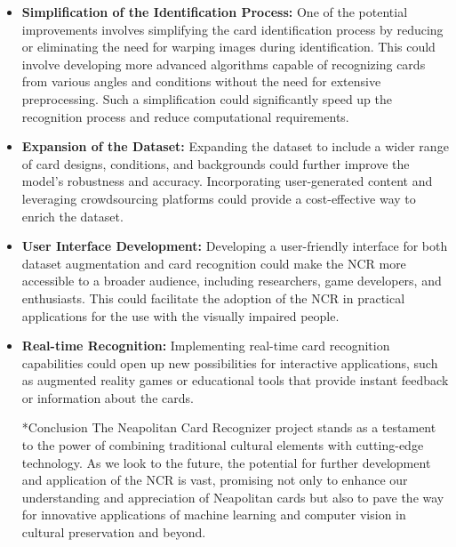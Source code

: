 \documentclass[twocolumn, a4paper,10pt]{article}
\makeatletter
\renewcommand\subsection{\@startsection{subsection}{1}{\z@}{\z@}{\z@}{\normalfont\normalsize\bfseries}}
\renewcommand\subsection{\@startsection{subsection}{1}{\z@}{\z@}{0.1pt}{\normalfont\normalsize\bfseries}}
\makeatother
\begin{document}
\begin{itemize}
  
  \item \textbf{Simplification of the Identification Process:} One of the potential improvements involves simplifying the card identification process by reducing or eliminating the need for warping images during identification. This could involve developing more advanced algorithms capable of recognizing cards from various angles and conditions without the need for extensive preprocessing. Such a simplification could significantly speed up the recognition process and reduce computational requirements.

  \item \textbf{Expansion of the Dataset:} Expanding the dataset to include a wider range of card designs, conditions, and backgrounds could further improve the model's robustness and accuracy. Incorporating user-generated content and leveraging crowdsourcing platforms could provide a cost-effective way to enrich the dataset.

  \item \textbf{User Interface Development:} Developing a user-friendly interface for both dataset augmentation and card recognition could make the NCR more accessible to a broader audience, including researchers, game developers, and enthusiasts. This could facilitate the adoption of the NCR in practical applications for the use with the visually impaired people.

  \item \textbf{Real-time Recognition:} Implementing real-time card recognition capabilities could open up new possibilities for interactive applications, such as augmented reality games or educational tools that provide instant feedback or information about the cards.

  \subsection*{Conclusion}   
The Neapolitan Card Recognizer project stands as a testament to the power of combining traditional cultural elements with cutting-edge technology. As we look to the future, the potential for further development and application of the NCR is vast, promising not only to enhance our understanding and appreciation of Neapolitan cards but also to pave the way for innovative applications of machine learning and computer vision in cultural preservation and beyond.
\end{itemize}
\nocite{*}


\newpage
\onecolumn
\end{document}
